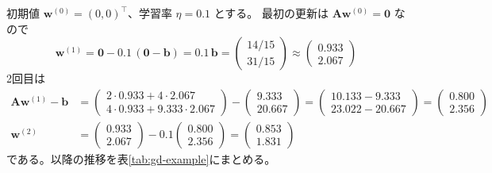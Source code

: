 初期値 $\bm{w}^{(0)} = (0, 0)^\top$、学習率 $\eta = 0.1$ とする。
最初の更新は $\bm{A}\bm{w}^{(0)} = \bm{0}$ なので
\begin{equation*}
  \bm{w}^{(1)} = \bm{0} - 0.1\,(\bm{0} - \bm{b}) = 0.1\,\bm{b}
   = \begin{pmatrix} 14/15 \\ 31/15 \end{pmatrix} \approx \begin{pmatrix} 0.933 \\ 2.067 \end{pmatrix}
\end{equation*}
2回目は
\begin{align*}
  \bm{A}\bm{w}^{(1)} - \bm{b}
    &= \begin{pmatrix} 2 \cdot 0.933 + 4 \cdot 2.067 \\ 4 \cdot 0.933 + 9.333 \cdot 2.067 \end{pmatrix}
       - \begin{pmatrix} 9.333 \\ 20.667 \end{pmatrix}
     = \begin{pmatrix} 10.133 - 9.333 \\ 23.022 - 20.667 \end{pmatrix}
     = \begin{pmatrix} 0.800 \\ 2.356 \end{pmatrix} \\
  \bm{w}^{(2)}
    &= \begin{pmatrix} 0.933 \\ 2.067 \end{pmatrix} - 0.1 \begin{pmatrix} 0.800 \\ 2.356 \end{pmatrix}
     = \begin{pmatrix} 0.853 \\ 1.831 \end{pmatrix}
\end{align*}
である。以降の推移を表\ref{tab:gd-example}にまとめる。

